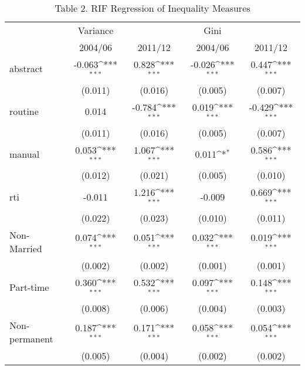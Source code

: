 \begin{table}[htbp]\centering
\def\sym#1{\ifmmode^{#1}\else\(^{#1}\)\fi}
\caption{Table 2. RIF Regression of Inequality Measures}
\begin{tabular}{l*{4}{c}}
\hline\hline
                    &    Variance         &                     &        Gini         &                     \\
                    &\multicolumn{1}{c}{2004/06}&\multicolumn{1}{c}{2011/12}&\multicolumn{1}{c}{2004/06}&\multicolumn{1}{c}{2011/12}\\
\hline
abstract            &      -0.063\sym{***}&       0.828\sym{***}&      -0.026\sym{***}&       0.447\sym{***}\\
                    &     (0.011)         &     (0.016)         &     (0.005)         &     (0.007)         \\
routine             &       0.014         &      -0.784\sym{***}&       0.019\sym{***}&      -0.429\sym{***}\\
                    &     (0.011)         &     (0.016)         &     (0.005)         &     (0.007)         \\
manual              &       0.053\sym{***}&       1.067\sym{***}&       0.011\sym{*}  &       0.586\sym{***}\\
                    &     (0.012)         &     (0.021)         &     (0.005)         &     (0.010)         \\
rti                 &      -0.011         &       1.216\sym{***}&      -0.009         &       0.669\sym{***}\\
                    &     (0.022)         &     (0.023)         &     (0.010)         &     (0.011)         \\
Non-Married         &       0.074\sym{***}&       0.051\sym{***}&       0.032\sym{***}&       0.019\sym{***}\\
                    &     (0.002)         &     (0.002)         &     (0.001)         &     (0.001)         \\
Part-time           &       0.360\sym{***}&       0.532\sym{***}&       0.097\sym{***}&       0.148\sym{***}\\
                    &     (0.008)         &     (0.006)         &     (0.004)         &     (0.003)         \\
Non-permanent       &       0.187\sym{***}&       0.171\sym{***}&       0.058\sym{***}&       0.054\sym{***}\\
                    &     (0.005)         &     (0.004)         &     (0.002)         &     (0.002)         \\

\end{tabular}
\end{table}
